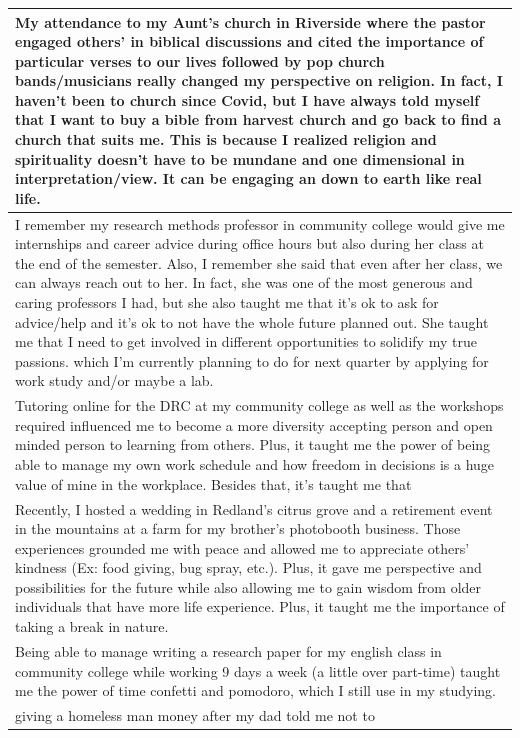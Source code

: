 \documentclass[
  .7em,
  letterpaper,
  DIV=11,
  numbers=noendperiod]{scrartcl}
\begin{document}
\begin{table}
\begin{tabular}{l}
\hline
My attendance to my Aunt's church in Riverside where the pastor engaged others' in biblical discussions and cited the importance of particular verses to our lives followed by pop church bands/musicians really changed my perspective on religion. In fact, I haven't been to church since Covid, but I have always told myself that I want to buy a bible from harvest church and go back to find a church that suits me. This is because I realized religion and spirituality doesn't have to be mundane and one dimensional in interpretation/view. It can be engaging an down to earth like real life.\\
\hline
I remember my research methods professor in community college would give me internships and career advice during office hours but also during her class at the end of the semester. Also, I remember she said that even after her class, we can always reach out to her. In fact, she was one of the most generous and caring professors I had, but she also taught me that it's ok to ask for advice/help and it's ok to not have the whole future planned out. She taught me that I need to get involved in different opportunities to solidify my true passions. which I'm currently planning to do for next quarter by applying for work study and/or maybe a lab.\\
\hline
Tutoring online for the DRC at my community college as well as the workshops required influenced me to become a more diversity accepting person and open minded person to learning from others. Plus, it taught me the power of being able to manage my own work schedule and how freedom in decisions is a huge value of mine in the workplace. Besides that, it's taught me that\\
\hline
Recently, I hosted a wedding in Redland's citrus grove and a retirement event in the mountains at a farm for my brother's photobooth business. Those experiences grounded me with peace and allowed me to appreciate others' kindness (Ex: food giving, bug spray, etc.). Plus, it gave me perspective and possibilities for the future while also allowing me to gain wisdom from older individuals that have more life experience. Plus, it taught me the importance of taking a break in nature.\\
\hline
Being able to manage writing a research paper for my english class in community college while working 9 days a week (a little over part-time) taught me the power of time confetti and pomodoro, which I still use in my studying.\\
\hline
giving a homeless man money after my dad told me not to\\

\end{tabular}
\end{table}
\end{document}
